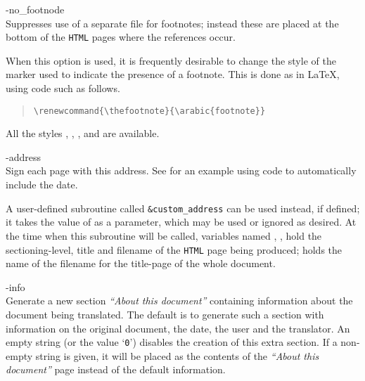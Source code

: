 \begin{htmllist}
\item [ -no\_footnode\label{nofootnode}]
\\
Suppresses use of a separate file for footnotes;
instead these are placed at the bottom of the \texttt{HTML} pages 
where the references occur.

When this option is used, it is frequently desirable to change the 
style of the marker used to indicate the presence of a footnote. 
This is done as in \LaTeX, using code such as follows.
\begin{quote}
\verb|\renewcommand{\thefootnote}{\arabic{footnote}}|
\end{quote}
All the styles , , ,  and 
are available.

%
%

\item [ -address \Meta{author-address}\label{address}]
\\
Sign each page with this address.\html{\\}
See  for an example using \Perl{} code
to automatically include the date.

\begin{changebar}
A user-defined \Perl{} subroutine called \texttt{\&custom\_address} 
can be used instead, if defined; it takes the value of  
as a parameter, which may be used or ignored as desired.
At the time when this subroutine will be called, 
variables named , , 
hold the sectioning-level, title and filename of the \texttt{HTML} page
being produced;  holds the name of the filename for the title-page
of the whole document.
\end{changebar}


\item [ -info \Meta{string}\label{infostring}]
\\
Generate a new section \emph{``About this document'' } containing information
about the document being translated. The default is to generate such a section 
with information on the original document, the date, the user and the translator.
An empty string (or the value `\texttt{0}') 
disables the creation of this extra section.\html{\\}
If a non-empty string is given, it will be placed as the contents of the 
\emph{``About this document'' } page instead of the default information.
%
\end{htmllist}


